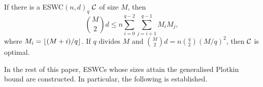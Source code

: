 \documentclass[draft, 11pt]{article}
\begin{document}
\begin{theorem}\label{plotkin}
If there is a ESWC$(n,d)_q$ $\mathcal C$ of size $M$, then
\begin{equation}\label{eq:plotkin}
\binom{M}{2} d \le n\sum_{i=0}^{q-2} \sum_{j=i+1}^{q-1} M_iM_j,
\end{equation}
\noindent where $M_i=\left\lfloor{(M+i)/q}\right\rfloor$.
If $q$ divides $M$ and
$\binom{M}{2} d = n\binom{q}{2}(M/q)^2$,
then $\mathcal C$ is optimal.
\end{theorem}



In the rest of this paper, ESWCs whose sizes attain the generalised Plotkin bound are constructed.
In particular, the following is established.
\end{document}

